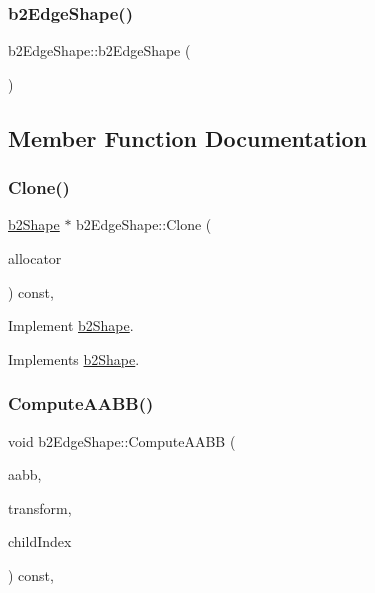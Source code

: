\subsubsection{\texorpdfstring{b2EdgeShape()}{b2EdgeShape()}}
{\footnotesize\ttfamily b2\+Edge\+Shape\+::b2\+Edge\+Shape (\begin{DoxyParamCaption}{ }\end{DoxyParamCaption})\hspace{0.3cm}{\ttfamily [inline]}}



\subsection{Member Function Documentation}
\mbox{\label{classb2_edge_shape_a52ed696717f44ed02b7a88ccf201563c}} 
\subsubsection{\texorpdfstring{Clone()}{Clone()}}
{\footnotesize\ttfamily \mbox{\hyperlink{classb2_shape}{b2\+Shape}} $\ast$ b2\+Edge\+Shape\+::\+Clone (\begin{DoxyParamCaption}\item[{\mbox{\hyperlink{classb2_block_allocator}{b2\+Block\+Allocator}} $\ast$}]{allocator }\end{DoxyParamCaption}) const\hspace{0.3cm}{\ttfamily [override]}, {\ttfamily [virtual]}}



Implement \mbox{\hyperlink{classb2_shape}{b2\+Shape}}. 



Implements \mbox{\hyperlink{classb2_shape_a4716243454bb9cf7c7ee1d9cb23ae634}{b2\+Shape}}.

\mbox{\label{classb2_edge_shape_a238139ae1736b457d77443133ff16854}} 
\subsubsection{\texorpdfstring{ComputeAABB()}{ComputeAABB()}}
{\footnotesize\ttfamily void b2\+Edge\+Shape\+::\+Compute\+A\+A\+BB (\begin{DoxyParamCaption}\item[{\mbox{\hyperlink{structb2_a_a_b_b}{b2\+A\+A\+BB}} $\ast$}]{aabb,  }\item[{const \mbox{\hyperlink{structb2_transform}{b2\+Transform}} \&}]{transform,  }\item[{\mbox{\hyperlink{b2_settings_8h_a43d43196463bde49cb067f5c20ab8481}{int32}}}]{child\+Index }\end{DoxyParamCaption}) const\hspace{0.3cm}{\ttfamily [override]}, {\ttfamily [virtual]}}

